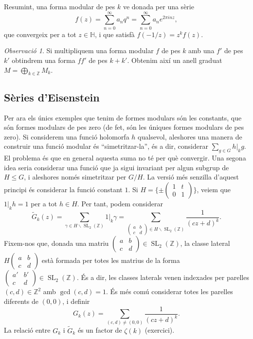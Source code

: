 \documentclass[
  letterpaper,
  DIV=11,
  numbers=noendperiod]{scrreprt}
\theoremstyle{plain}
\theoremstyle{plain}
\theoremstyle{definition}
\theoremstyle{plain}
\theoremstyle{plain}
\theoremstyle{definition}
\theoremstyle{remark}
\newtheorem{refremark}{Observació}[chapter]
\begin{document}
Resumint, una forma modular de pes \(k\) ve donada per una sèrie \[
f(z) = \sum_{n=0}^\infty a_n q^n = \sum_{n=0}^\infty a_ne^{2\pi i nz},
\] que convergeix per a tot \(z\in \mathbb{H}\), i que satisfà
\(f(-1/z) = z^kf(z)\).

\begin{refremark}
Si multipliquem una forma modular \(f\) de pes \(k\) amb una \(f'\) de
pes \(k'\) obtindrem una forma \(ff'\) de pes \(k+k'\). Obtenim així un
anell graduat \(M=\bigoplus_{k\in\mathbb{Z}} M_k\).

\label{rem-}

\end{refremark}

\subsection{Sèries d'Eisenstein}\label{suxe8ries-deisenstein}

Per ara els únics exemples que tenim de formes modulars són les
constants, que són formes modulars de pes zero (de fet, són les úniques
formes modulars de pes zero). Si considerem una funció holomorfa \(h\)
qualsevol, aleshores una manera de construir una funció modular és
``simetritzar-la'', és a dir, considerar \(\sum_{g\in G} h|_{k} g\). El
problema és que en general aquesta suma no té per què convergir. Una
segona idea seria considerar una funció que ja sigui invariant per algun
subgrup de \(H\leq G\), i aleshores només simetritzar per \(G/H\). La
versió més senzilla d'aquest principi és considerar la funció constant
\(1\). Si
\(H=\{ \pm \left(\begin{smallmatrix}1&t\\0&1\end{smallmatrix}\right)\}\),
veiem que \(1|_{k} h=1\) per a tot \(h\in H\). Per tant, podem
considerar \[
\tilde G_k(z) = \sum_{\gamma \in H\backslash \operatorname{SL}_2(\mathbb{Z})} 1|_{k} \gamma= \sum_{\left(\begin{smallmatrix}a&b\\c&d\end{smallmatrix}\right) \in H \backslash \operatorname{SL}_2(\mathbb{Z})} \frac{1}{(cz+d)^{k}}.
\] Fixem-nos que, donada una matriu
\(\left(\begin{smallmatrix}a&b\\c&d\end{smallmatrix}\right)\in \operatorname{SL}_2(\mathbb{Z})\),
la classe lateral
\(H\left(\begin{smallmatrix}a&b\\c&d\end{smallmatrix}\right)\) està
formada per totes les matrius de la forma
\(\left(\begin{smallmatrix}a'&b'\\c&d\end{smallmatrix}\right)\in\operatorname{SL}_2(\mathbb{Z})\).
És a dir, les classes laterals venen indexades per parelles
\((c,d)\in\mathbb{Z}^2\) amb \(\gcd(c,d)=1\). És més comú considerar
totes les parelles diferents de \((0,0)\), i definir \[
G_k(z) = \sum_{(c,d)\neq (0,0)} \frac{1}{(cz+d)^k}.
\] La relació entre \(G_k\) i \(\tilde G_k\) és un factor de
\(\zeta(k)\) (exercici).
\end{document}

